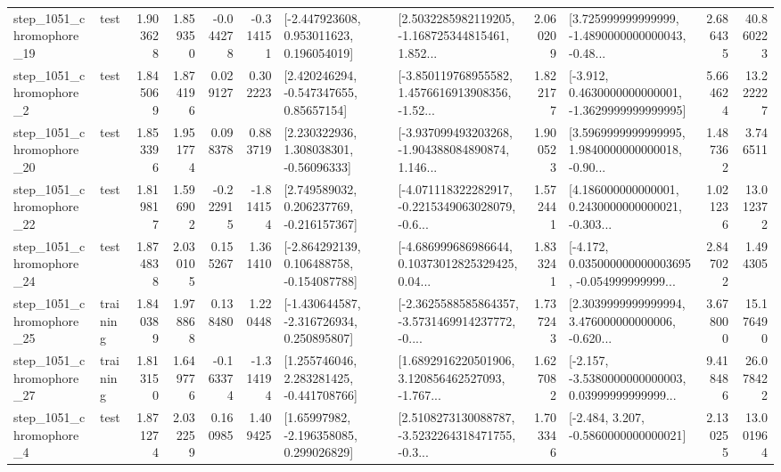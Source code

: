 \begin{tabular}{llrrrrllrlrr}
 step\_1051\_chromophore\_19 &      test &      1.903628 &    1.859350 &     -0.044278 & -0.314151 &    [-2.447923608, 0.953011623, 0.196054019] &  [2.5032285982119205, -1.168725344815461, 1.852... &       2.060209 &  [3.725999999999999, -1.4890000000000043, -0.48... &            2.686435 &         40.860223 \\
  step\_1051\_chromophore\_2 &      test &      1.845069 &    1.874196 &      0.029127 &  0.302223 &     [2.420246294, -0.547347655, 0.85657154] &  [-3.850119768955582, 1.4576616913908356, -1.52... &       1.822177 &  [-3.912, 0.4630000000000001, -1.3629999999999995] &            5.664624 &         13.222227 \\
 step\_1051\_chromophore\_20 &      test &      1.853396 &    1.951774 &      0.098378 &  0.883719 &     [2.230322936, 1.308038301, -0.56096333] &  [-3.937099493203268, -1.904388084890874, 1.146... &       1.900523 &  [3.5969999999999995, 1.9840000000000018, -0.90... &            1.487362 &          3.746511 \\
 step\_1051\_chromophore\_22 &      test &      1.819817 &    1.596902 &     -0.222915 & -1.814154 &    [2.749589032, 0.206237769, -0.216157367] &  [-4.071118322282917, -0.2215349063028079, -0.6... &       1.572441 &  [4.186000000000001, 0.2430000000000021, -0.303... &            1.021236 &         13.012372 \\
 step\_1051\_chromophore\_24 &      test &      1.874838 &    2.030105 &      0.155267 &  1.361410 &   [-2.864292139, 0.106488758, -0.154087788] &  [-4.686999686986644, 0.10373012825329425, 0.04... &       1.833241 &  [-4.172, 0.035000000000003695, -0.054999999999... &            2.847022 &          1.494305 \\
 step\_1051\_chromophore\_25 &  training &      1.840389 &    1.978868 &      0.138480 &  1.220448 &   [-1.430644587, -2.316726934, 0.250895807] &  [-2.3625588585864357, -3.5731469914237772, -0.... &       1.737243 &  [2.3039999999999994, 3.476000000000006, -0.620... &            3.678000 &         15.176490 \\
 step\_1051\_chromophore\_27 &  training &      1.813150 &    1.649776 &     -0.163374 & -1.314194 &    [1.255746046, 2.283281425, -0.441708766] &  [1.6892916220501906, 3.120856462527093, -1.767... &       1.627082 &  [-2.157, -3.5380000000000003, 0.03999999999999... &            9.418486 &         26.078422 \\
  step\_1051\_chromophore\_4 &      test &      1.871274 &    2.032259 &      0.160985 &  1.409425 &     [1.65997982, -2.196358085, 0.299026829] &  [2.5108273130088787, -3.5232264318471755, -0.3... &       1.703346 &               [-2.484, 3.207, -0.5860000000000021] &            2.130255 &         13.001964 \\

\end{tabular}
